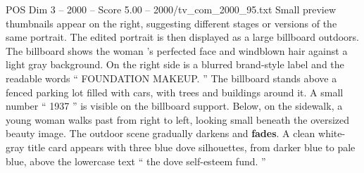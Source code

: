 \begin{textsample}{POS Dim 3 – 2000 – Score 5.00 – 2000/tv\_com\_2000\_95.txt}
Small preview thumbnails appear on the right, suggesting different stages or versions of the same portrait.
The edited portrait is then displayed as a large billboard outdoors.
The billboard shows the woman ’s perfected face and windblown hair against a light gray background.
On the right side is a blurred brand-style label and the readable words “ FOUNDATION MAKEUP. ” The billboard stands above a fenced parking lot filled with cars, with trees and buildings around it.
A small number “ 1937 ” is visible on the billboard support.
Below, on the sidewalk, a young woman walks past from right to left, looking small beneath the oversized beauty image.
The outdoor scene gradually darkens and \textbf{fades}.
A clean white-gray title card appears with three blue dove silhouettes, from darker blue to pale blue, above the lowercase text “ the dove self-esteem fund. ”

\end{textsample}
